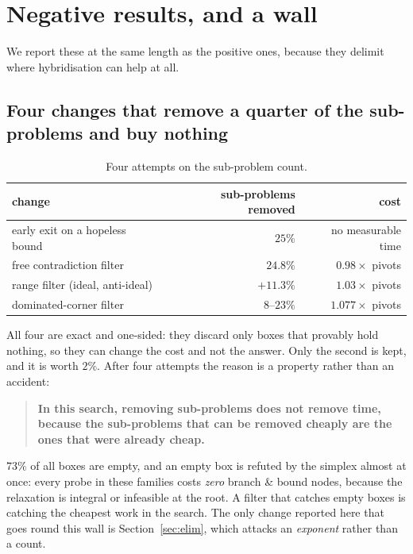 \documentclass[11pt,a4paper]{article}
\begin{document}
\section{Negative results, and a wall}
\label{sec:wall}

We report these at the same length as the positive ones, because they delimit
where hybridisation can help at all.

\subsection{Four changes that remove a quarter of the sub-problems and buy
nothing}

\begin{table}[h]
\centering
\caption{Four attempts on the sub-problem count.}
\label{tab:wall}
\begin{tabular}{lrr}
\toprule
change & sub-problems removed & cost \\
\midrule
early exit on a hopeless bound     & $25\%$       & no measurable time \\
free contradiction filter          & $24.8\%$     & $0.98\times$ pivots \\
range filter (ideal, anti-ideal)   & $+11.3\%$    & $1.03\times$ pivots \\
dominated-corner filter            & $8$--$23\%$  & $1.077\times$ pivots \\
\bottomrule
\end{tabular}
\end{table}

\noindent
All four are exact and one-sided: they discard only boxes that provably hold
nothing, so they can change the cost and not the answer.  Only the second is
kept, and it is worth $2\%$.  After four attempts the reason is a property
rather than an accident:

\begin{quote}
\textbf{In this search, removing sub-problems does not remove time, because the
sub-problems that can be removed cheaply are the ones that were already cheap.}
\end{quote}

\noindent
$73\%$ of all boxes are empty, and an empty box is refuted by the simplex
almost at once: every probe in these families costs \emph{zero} branch \& bound
nodes, because the relaxation is integral or infeasible at the root.  A filter
that catches empty boxes is catching the cheapest work in the search.  The only
change reported here that goes round this wall is Section~\ref{sec:elim},
which attacks an \emph{exponent} rather than a count.
\end{document}
